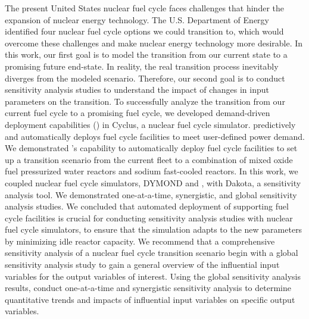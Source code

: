 \vspace{-1.5cm}
The present United States nuclear fuel cycle faces challenges that hinder 
the expansion of nuclear energy technology. 
The U.S. Department of Energy identified four nuclear fuel cycle 
options we could transition to, which would overcome these challenges 
and make nuclear energy technology more desirable. 
In this work, our first goal is to model the transition from our current
state to a promising future end-state.
In reality, the real transition process inevitably diverges from the 
modeled scenario. 
Therefore, our second goal is to conduct sensitivity analysis 
studies to understand the impact of changes in input parameters
on the transition. 
To successfully analyze the transition from our current fuel cycle to 
a promising fuel cycle, we developed demand-driven deployment capabilities 
(\deploy) in Cyclus, a nuclear fuel cycle simulator. 
\deploy predictively and automatically deploys fuel cycle facilities 
to meet user-defined power demand.
We demonstrated \deploy's capability to automatically deploy fuel 
cycle facilities to set up a transition scenario from the current 
fleet to a combination of mixed oxide fuel pressurized water reactors 
and sodium fast-cooled reactors. 
In this work, we coupled nuclear fuel cycle simulators, DYMOND 
and \Cyclus, with Dakota, a sensitivity analysis tool. 
We demonstrated 
one-at-a-time, synergistic, and global sensitivity analysis studies.
We concluded that automated deployment of supporting fuel cycle 
facilities is crucial for conducting sensitivity analysis studies 
with nuclear fuel cycle simulators, to ensure that the simulation 
adapts to the new parameters by minimizing idle reactor capacity. 
We recommend that a comprehensive sensitivity analysis of a 
nuclear fuel cycle transition scenario begin with a global 
sensitivity analysis study to gain a general overview of the 
influential input variables for the output variables of interest. 
Using the global sensitivity analysis results, 
conduct one-at-a-time and synergistic sensitivity 
analysis to determine quantitative trends and impacts of influential 
input variables on specific output variables.
